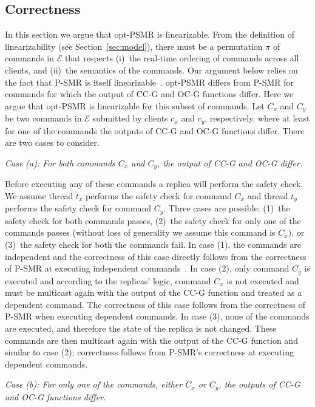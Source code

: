 \documentclass[conference]{IEEEtran}
\begin{document}
\subsection{Correctness}
\label{sec:correct}

In this section we argue that opt-PSMR is linearizable.
From the definition of linearizability (see Section~\ref{sec:model}), there must be a permutation $\pi$ of commands in $\mathcal{E}$ that respects (i)~the real-time ordering of commands across all clients, and (ii)~the semantics of the commands. 
Our argument below relies on the fact that P-SMR is itself linearizable~\cite{p-smr}. 
opt-PSMR differs from P-SMR for commands for which the output of CC-G and OC-G functions differ.
Here we argue that opt-PSMR is linearizable for this subset of commands. 
Let $C_x$ and $C_y$ be two commands in $\mathcal{E}$ submitted by clients $c_x$ and $c_y$, respectively, where at least for one of the commands the outputs of CC-G and OC-G functions differ. There are two cases to consider. 

\noindent \emph{Case (a): For both commands $C_x$ and $C_y$, the output of CC-G and OC-G differ.} 



Before executing any of these commands a replica will perform the safety check. 
We assume thread $t_x$ performs the safety check for command $C_x$ and thread $t_y$ performs the safety check for command $C_y$. 
Three cases are possible: (1)~the safety check for both commands passes, (2)~the safety check for only one of the commands passes (without loss of generality we assume this command is $C_x$), or (3)~the safety check for both the commands fail. 
In case (1), the commands are independent and the correctness of this case directly follows from the correctness of P-SMR at executing independent commands~\cite{p-smr}. 
In case (2), only command $C_y$ is executed and according to the replicas' logic, command $C_x$ is not executed and must be multicast again with the output of the CC-G function and treated as a dependent command. 
The correctness of this case follows from the correctness of P-SMR when executing dependent commands. 
In case (3), none of the commands are executed, and therefore the state of the replica is not changed. 
These commands are then multicast again with the output of the CC-G function and similar to case (2); correctness follows from P-SMR's correctness at executing dependent commands. 



\noindent \emph{Case (b): For only one of the commands, either $C_x$ or $C_y$, the outputs of CC-G and OC-G functions differ.}
\end{document}
